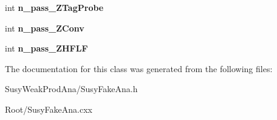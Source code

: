 \begin{DoxyCompactItemize}
\item 
\hypertarget{classSusyFakeAna_a95feee4f33f214554e29475b41c46051}{
int {\bfseries n\_\-pass\_\-ZTagProbe}}
\label{classSusyFakeAna_a95feee4f33f214554e29475b41c46051}

\item 
\hypertarget{classSusyFakeAna_ae203e2e952160c23b14aad4de6cca58f}{
int {\bfseries n\_\-pass\_\-ZConv}}
\label{classSusyFakeAna_ae203e2e952160c23b14aad4de6cca58f}

\item 
\hypertarget{classSusyFakeAna_a65fe91dac6ce7619f524cad7dfcd7854}{
int {\bfseries n\_\-pass\_\-ZHFLF}}
\label{classSusyFakeAna_a65fe91dac6ce7619f524cad7dfcd7854}

\end{DoxyCompactItemize}


The documentation for this class was generated from the following files:\begin{DoxyCompactItemize}
\item 
SusyWeakProdAna/SusyFakeAna.h\item 
Root/SusyFakeAna.cxx\end{DoxyCompactItemize}
